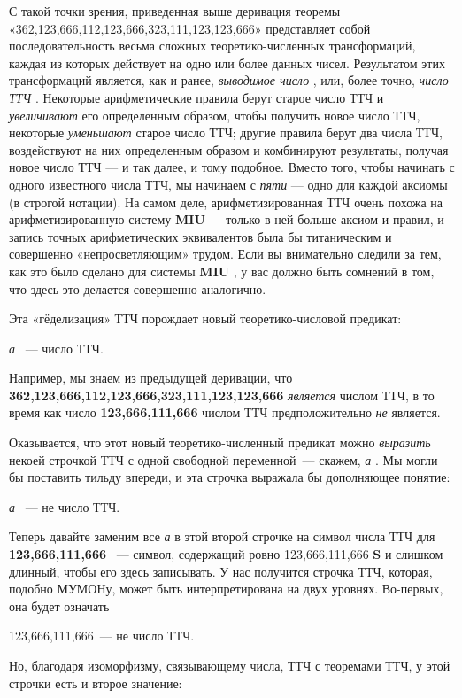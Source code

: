 \documentclass[../main.tex]{subfiles}
\begin{document}
С такой точки зрения, приведенная выше деривация теоремы «362,123,666,112,123,666,323,111,123,123,666» представляет собой последовательность весьма сложных теоретико-численных трансформаций, каждая из которых действует на одно или более данных чисел. Результатом этих трансформаций является, как и ранее, \emph{выводимое число} , или, более точно, \emph{число ТТЧ} . Некоторые арифметические правила берут старое число ТТЧ и \emph{увеличивают} его определенным образом, чтобы получить новое число ТТЧ, некоторые \emph{уменьшают} старое число ТТЧ; другие правила берут два числа ТТЧ, воздействуют на них определенным образом и комбинируют результаты, получая новое число ТТЧ --- и так далее, и тому подобное. Вместо того, чтобы начинать с одного известного числа ТТЧ, мы начинаем с \emph{пяти} --- одно для каждой аксиомы (в строгой нотации). На самом деле, арифметизированная ТТЧ очень похожа на арифметизированную систему \textbf{MIU} --- только в ней больше аксиом и правил, и запись точных арифметических эквивалентов была бы титаническим и совершенно «непросветляющим» трудом. Если вы внимательно следили за тем, как это было сделано для системы \textbf{MIU} , у вас должно быть сомнений в том, что здесь это делается совершенно аналогично.

Эта «гёделизация» ТТЧ порождает новый теоретико-числовой предикат:

\emph{а} ~--- число ТТЧ.

Например, мы знаем из предыдущей деривации, что \textbf{362,123,666,112,123,666,323,111,123,123,666} \emph{является} числом ТТЧ, в то время как число \textbf{123,666,111,666} числом ТТЧ предположительно \emph{не} является.

Оказывается, что этот новый теоретико-численный предикат можно \emph{выразить} некоей строчкой ТТЧ с одной свободной переменной~--- скажем, \emph{а} . Мы могли бы поставить тильду впереди, и эта строчка выражала бы дополняющее понятие:

\emph{а} ~--- не число ТТЧ.

Теперь давайте заменим все \emph{а} в этой второй строчке на символ числа ТТЧ для \textbf{123,666,111,666} ~--- символ, содержащий ровно 123,666,111,666 \textbf{S} и слишком длинный, чтобы его здесь записывать. У нас получится строчка ТТЧ, которая, подобно МУМОНу, может быть интерпретирована на двух уровнях. Во-первых, она будет означать

123,666,111,666~--- не число ТТЧ.

Но, благодаря изоморфизму, связывающему числа, ТТЧ с теоремами ТТЧ, у этой строчки есть и второе значение:
\end{document}
